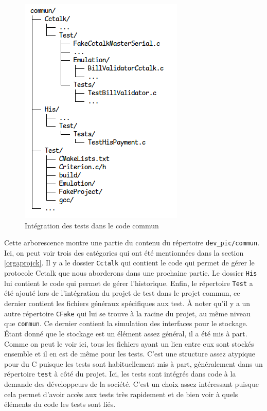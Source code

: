 \documentclass[a4paper]{article}
\begin{document}
\begin{figure}[h!]
  \begin{center}
    \includegraphics[scale=0.7]{./img/arborescence-commun.png}
    \caption{Intégration des tests dans le code commun}
    \label{fig:integrtestcommun}
  \end{center}
\end{figure}

Cette arborescence montre une partie du contenu du répertoire
\verb|dev_pic/commun|. Ici, on peut voir trois des catégories qui ont été
mentionnées dans la section \ref{orgaprojck}. Il y a le dossier \verb|Cctalk|
qui contient le code qui permet de gérer le protocole Cctalk que nous aborderons
dans une prochaine partie. Le dossier \verb|His| lui contient le code qui permet
de gérer l'historique. Enfin, le répertoire \verb|Test| a été ajouté lors de
l'intégration du projet de test dans le projet commun, ce dernier contient les
fichiers généraux spécifiques aux test. À noter qu'il y a un autre répertoire
\verb|CFake| qui lui se trouve à la racine du projet, au même niveau que
\verb|commun|. Ce dernier contient la simulation des interfaces pour le
stockage. Étant donné que le stockage est un élément assez général, il a été mis
à part. Comme on peut le voir ici, tous les fichiers ayant un lien entre eux
sont stockés ensemble et il en est de même pour les tests. C'est une structure
assez atypique pour du C puisque les tests sont habituellement mis à part,
généralement dans un répertoire \verb|test| à côté du projet. Ici, les tests
sont intégrés dans code à la demande des développeurs de la société. C'est un
choix assez intéressant puisque cela permet d'avoir accès aux tests très
rapidement et de bien voir à quels éléments du code les tests sont liés.
\end{document}
